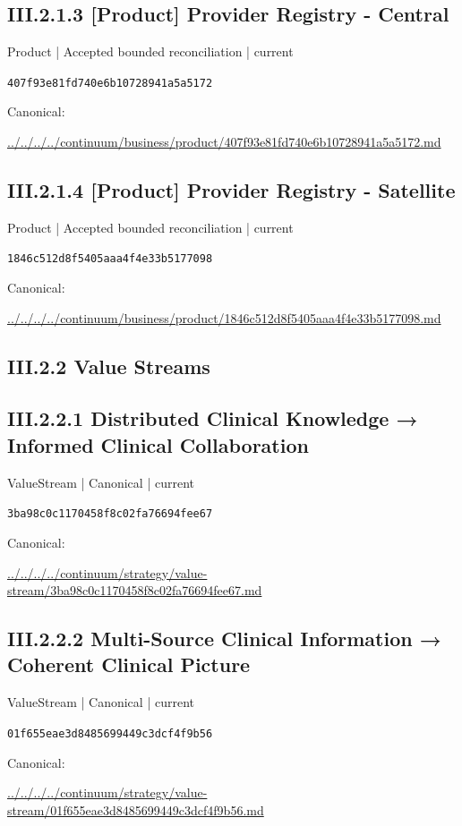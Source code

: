 \documentclass[10pt,a4paper]{article}
\begin{document}
\subsection*{III.2.1.3 [Product] Provider Registry - Central}
{\small Product | Accepted bounded reconciliation | current}\par
\texttt{407f93e81fd740e6b10728941a5a5172}\par
Canonical: \par
{\footnotesize\url{../../../../continuum/business/product/407f93e81fd740e6b10728941a5a5172.md}}\par
\subsection*{III.2.1.4 [Product] Provider Registry - Satellite}
{\small Product | Accepted bounded reconciliation | current}\par
\texttt{1846c512d8f5405aaa4f4e33b5177098}\par
Canonical: \par
{\footnotesize\url{../../../../continuum/business/product/1846c512d8f5405aaa4f4e33b5177098.md}}\par
\subsection*{III.2.2 Value Streams}
\subsection*{III.2.2.1 Distributed Clinical Knowledge → Informed Clinical Collaboration}
{\small ValueStream | Canonical | current}\par
\texttt{3ba98c0c1170458f8c02fa76694fee67}\par
Canonical: \par
{\footnotesize\url{../../../../continuum/strategy/value-stream/3ba98c0c1170458f8c02fa76694fee67.md}}\par
\subsection*{III.2.2.2 Multi-Source Clinical Information → Coherent Clinical Picture}
{\small ValueStream | Canonical | current}\par
\texttt{01f655eae3d8485699449c3dcf4f9b56}\par
Canonical: \par
{\footnotesize\url{../../../../continuum/strategy/value-stream/01f655eae3d8485699449c3dcf4f9b56.md}}\par
\end{document}
